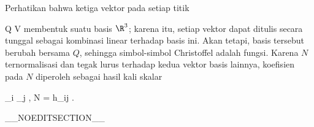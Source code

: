 Perhatikan bahwa ketiga vektor
pada setiap titik

\mavergleichskette
{\vergleichskette
{ Q
}
{ \in }{ V
}
{  }{
}
{    }{
}
{   }{
}
}
{}{}{}
membentuk suatu basis $\R^3$;
karena itu, setiap vektor dapat ditulis secara tunggal sebagai kombinasi linear terhadap basis ini. Akan tetapi, basis tersebut berubah bersama $Q$, sehingga simbol-simbol Christoffel adalah fungsi. Karena $N$ ternormalisasi dan tegak lurus terhadap kedua vektor basis lainnya, koefisien pada $N$ diperoleh sebagai hasil kali skalar

\mavergleichskette
{\vergleichskette
{ \left\langle  \partial_i \partial_j \varphi , N  \right\rangle
}
{ = }{ h_{ij}
}
{  }{
}
{    }{
}
{   }{
}
}
{}{}{.}

__NOEDITSECTION__

